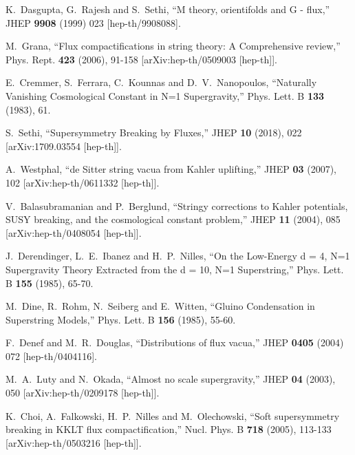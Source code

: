 \documentclass[12pt]{article}
\numberwithin{equation}{section}
\begin{document}
\begin{thebibliography}{999}
  K.~Dasgupta, G.~Rajesh and S.~Sethi,
  ``M theory, orientifolds and G - flux,''
  JHEP {\bf 9908} (1999) 023 [hep-th/9908088].

M.~Grana, ``Flux compactifications in string theory: A Comprehensive review,'' Phys. Rept. \textbf{423} (2006), 91-158 [arXiv:hep-th/0509003 [hep-th]].

E.~Cremmer, S.~Ferrara, C.~Kounnas and D.~V.~Nanopoulos,
``Naturally Vanishing Cosmological Constant in N=1 Supergravity,'' Phys. Lett. B \textbf{133} (1983), 61.

S.~Sethi,
``Supersymmetry Breaking by Fluxes,''
JHEP \textbf{10} (2018), 022
[arXiv:1709.03554 [hep-th]].

A.~Westphal,
``de Sitter string vacua from Kahler uplifting,''
JHEP \textbf{03} (2007), 102
[arXiv:hep-th/0611332 [hep-th]].

V.~Balasubramanian and P.~Berglund,
``Stringy corrections to Kahler potentials, SUSY breaking, and the cosmological constant problem,''
JHEP \textbf{11} (2004), 085
[arXiv:hep-th/0408054 [hep-th]].

J.~Derendinger, L.~E.~Ibanez and H.~P.~Nilles,
``On the Low-Energy d = 4, N=1 Supergravity Theory Extracted from the d = 10, N=1 Superstring,''
Phys. Lett. B \textbf{155} (1985), 65-70.

M.~Dine, R.~Rohm, N.~Seiberg and E.~Witten,
``Gluino Condensation in Superstring Models,''
Phys. Lett. B \textbf{156} (1985), 55-60.

  F.~Denef and M.~R.~Douglas,
  ``Distributions of flux vacua,''
  JHEP {\bf 0405} (2004) 072
  [hep-th/0404116].

M.~A.~Luty and N.~Okada,
``Almost no scale supergravity,''
JHEP \textbf{04} (2003), 050
[arXiv:hep-th/0209178 [hep-th]].

K.~Choi, A.~Falkowski, H.~P.~Nilles and M.~Olechowski,
``Soft supersymmetry breaking in KKLT flux compactification,''
Nucl. Phys. B \textbf{718} (2005), 113-133
[arXiv:hep-th/0503216 [hep-th]].


\end{thebibliography}
\end{document}
